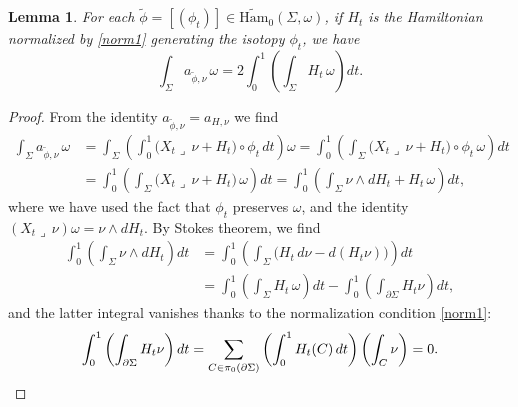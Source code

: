 \documentclass[10pt,a4paper]{article}
\newtheorem{lem}[thm]{Lemma}
\theoremstyle{definition}
\newcommand{\Ham}{\mathrm{Ham}}
\begin{document}
\begin{lem}
\label{l:Calabi}
For each $\tilde{\phi}=[(\phi_t)]\in\widetilde{\Ham}_0(\Sigma,\omega)$, if $H_t$ is the Hamiltonian normalized by \eqref{norm1} generating the isotopy $\phi_t$, we have
\[
\int_{\Sigma} a_{\tilde{\phi},\nu} \, \omega = 2 \int_0^1\left( \int_{\Sigma} H_t\, \omega \right) dt.
\]
\end{lem}

\begin{proof}
From the identity $a_{\tilde{\phi},\nu}=a_{H,\nu}$ we find
\begin{align*}
\int_{\Sigma} a_{\tilde{\phi},\nu} \, \omega
&= \int_{\Sigma} \left( \int_0^1 \bigl( X_t \lrcorner \, \nu + H_t \bigr) \circ \phi_t\, dt \right) \omega = \int_0^1 \left( \int_{\Sigma} \bigl( X_t \lrcorner \, \nu + H_t \bigr) \circ \phi_t\, \omega \right) dt \\
&= \int_0^1 \left( \int_{\Sigma} \bigl( X_t \lrcorner \, \nu + H_t \bigr) \, \omega \right) dt
= \int_0^1 \left( \int_{\Sigma} \nu \wedge dH_t + H_t\, \omega \right) dt,
\end{align*}
where we have used the fact that $\phi_t$ preserves $\omega$, and the identity $(X_t \lrcorner \, \nu)\omega = \nu \wedge dH_t$. By Stokes theorem, we find
\begin{align*}
\int_0^1 \left( \int_{\Sigma} \nu \wedge dH_t \right) dt & = \int_0^1 \left( \int_{\Sigma} \bigl( H_t\, d\nu - d(H_t \nu) \bigr) \right) dt \\
& = \int_0^1\left( \int_{\Sigma} H_t\, \omega \right) dt - \int_0^1 \left( \int_{\partial\Sigma} H_t \nu \right) dt,
\end{align*}
and the latter integral vanishes thanks to the normalization condition \eqref{norm1}:
\[
\int_0^1 \left( \int_{\partial\Sigma} H_t \nu \right) dt = \sum_{C\in\pi_0(\partial\Sigma)} \left( \int_0^1 H_t(C) \, dt \right) \left( \int_C \nu \right) = 0.
\qedhere
\]
\end{proof}
\end{document}
